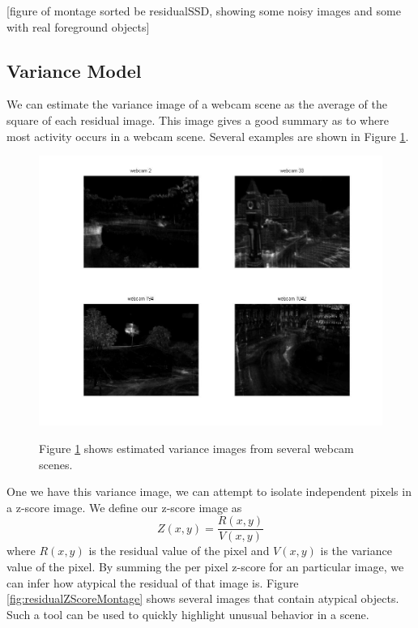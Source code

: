[figure of montage sorted be residualSSD, showing some noisy images and some with real foreground objects]


\subsection{Variance Model}

We can estimate the variance image of a webcam scene as the average of the square of each residual image.  This image gives a good summary as to where most activity occurs in a webcam scene.  Several examples are shown in Figure \ref{fig:severalVarianceImages}.

\begin{figure}
	\centering
		\includegraphics[width=1\textwidth]{figures/severalVarianceImages.jpg}
	\label{fig:severalVarianceImages}
	
		\caption[Several variance images.]{Figure \ref{fig:severalVarianceImages} shows estimated variance images from several webcam scenes.}
\end{figure}

One we have this variance image, we can attempt to isolate independent pixels in a z-score image.  We define our z-score image as $$Z(x,y) = \frac{R(x,y)} { V(x,y)}$$ where $R(x,y)$ is the residual value of the pixel and $V(x,y)$ is the variance value of the pixel.  By summing the per pixel z-score for an particular image, we can infer how atypical the residual of that image is.  Figure \ref{fig:residualZScoreMontage} shows several images that contain atypical objects.  Such a tool can be used to quickly highlight unusual behavior in a scene.

